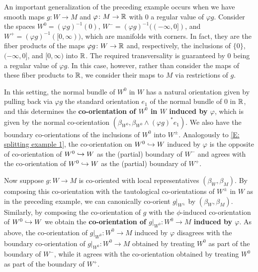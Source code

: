 \begin{example}\label{E: manifold decomposition}
	An important generalization of the preceding example occurs when we have smooth maps $g \colon W \to M$ and $\varphi \colon M \to \mathbb{R}$ with $0$ a regular value of $\varphi g$.
	Consider the spaces $W^0 = (\varphi g)^{-1}(0)$, $W^- = (\varphi g)^{-1}((-\infty,0])$, and $W^+ = (\varphi g)^{-1}([0,\infty))$, which are manifolds with corners.
	In fact, they are the fiber products of the maps $\varphi g \colon W \to \mathbb{R}$ and, respectively, the inclusions of $\{0\}$, $(-\infty, 0]$, and $[0,\infty)$ into $\mathbb{R}$.
	The required transversality is guaranteed by $0$ being a regular value of $\varphi g$.
	In this case, however, rather than consider the maps of these fiber products to $\mathbb{R}$, we consider their maps to $M$ via restrictions of $g$.

	In this setting, the normal bundle of $W^0$ in $W$ has a natural orientation given by pulling back via $\varphi g$ the standard orientation $e_1$ of the normal bundle of $0$ in $\mathbb{R}$, and this determines the \textbf{co-orientation of $W^0$ in $W$ induced by $\varphi$}, which is given by the normal co-orientation $(\beta_{W^0}, \beta_{W^0} \wedge (\varphi g)^*e_1)$.
	We also have the boundary co-orientations of the inclusions of $W^0$ into $W^{\pm}$.
	Analogously to \cref{E: splitting example 1}, the co-orientation on $W^0 \hookrightarrow W$ induced by $\varphi$ is the opposite of co-orientation of $W^0 \hookrightarrow W$ as the (partial) boundary of $W^-$ and agrees with the co-orientation of $W^0 \hookrightarrow W$ as the (partial) boundary of $W^+$.

	Now suppose $g \colon W \to M$ is co-oriented with local representatives $(\beta_W, \beta_M)$.
	By composing this co-orientation with the tautological co-orientations of $W^\pm$ in $W$ as in the preceding example, we can canonically co-orient $g|_{W^\pm}$ by $(\beta_W, \beta_M)$.
	Similarly, by composing the co-orientation of $g$ with the $\phi$-induced co-orientation of $W^0 \hookrightarrow W$ we obtain the \textbf{co-orientation of $g|_{W^0} \colon W^0 \to M$ induced by $\varphi$}.
	As above, the co-orientation of $g|_{W^0} \colon W^0 \to M$ induced by $\varphi$ disagrees with the boundary co-orientation of $g|_{W^0} \colon W^0 \to M$ obtained by treating $W^0$ as part of the boundary of $W^-$, while it agrees with the co-orientation obtained by treating $W^0$ as part of the boundary of $W^+$.


\end{example}
